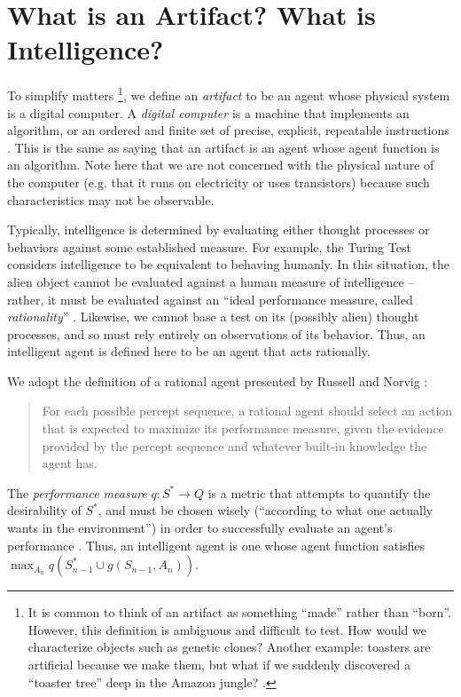 \documentclass[12pt,letterpaper]{article}
\begin{document}
\section*{What is an Artifact? What is Intelligence?}

To simplify matters \footnote{It is common to think of an artifact as something ``made'' rather than ``born''. However, this definition is ambiguous and difficult to test. How would we characterize objects such as genetic clones? Another example: toasters are artificial because we make them, but what if we suddenly discovered a ``toaster tree'' deep in the Amazon jungle? \cite{CM317}.}, we define an \emph{artifact} to be an agent whose physical system is a digital computer. A \emph{digital computer} is a machine that implements an algorithm, or an ordered and finite set of precise, explicit, repeatable instructions \cite{Anderson:2006}. This is the same as saying that an artifact is an agent whose agent function is an algorithm. Note here that we are not concerned with the physical nature of the computer (e.g. that it runs on electricity or uses transistors) because such characteristics may not be observable.

Typically, intelligence is determined by evaluating either thought processes or behaviors against some established measure. For example, the Turing Test considers intelligence to be equivalent to behaving humanly. In this situation, the alien object cannot be evaluated against a human measure of intelligence -- rather, it must be evaluated against an ``ideal performance measure, called \emph{rationality}'' \cite[p.~1]{Russell:2010}. Likewise, we cannot base a test on its (possibly alien) thought processes, and so must rely entirely on observations of its behavior. Thus, an intelligent agent is defined here to be an agent that acts rationally.

We adopt the definition of a rational agent presented by Russell and Norvig \cite[p.~37]{Russell:2010}:

\begin{quote}
	\singlespacing
	For each possible percept sequence, a rational agent should select an action that is expected to maximize its performance measure, given the evidence provided by the percept sequence and whatever built-in knowledge the agent has.
\end{quote}

The \emph{performance measure} $q : S^\ast \to Q$ is a metric that attempts to quantify the desirability of $S^\ast$, and must be chosen wisely (``according to what one actually wants in the environment'') in order to successfully evaluate an agent's performance \cite[p.~37]{Russell:2010}. Thus, an intelligent agent is one whose agent function satisfies $\max_{A_n} q(S_{n-1}^\ast \cup g(S_{n-1}, A_n))$.
\end{document}
